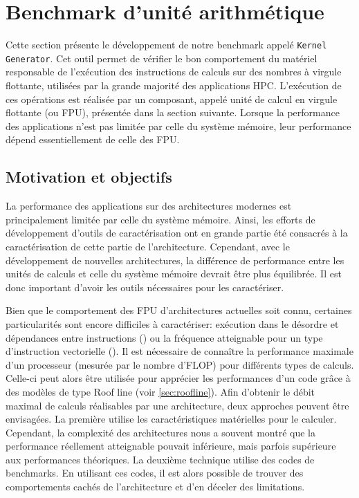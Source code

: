 \section{Benchmark d'unité arithmétique}\label{sec:kg}


    Cette section présente le développement de notre benchmark appelé \verb=Kernel Generator=. Cet outil permet de vérifier le bon comportement du matériel responsable de l'exécution des instructions de calculs sur des nombres à virgule flottante, utilisées par la grande majorité des applications HPC. L'exécution de ces opérations est réalisée par un composant, appelé unité de calcul en virgule flottante (ou \gls{FPU}), présentée dans la section suivante. Lorsque la performance des applications n'est pas limitée par celle du système mémoire, leur performance dépend essentiellement de celle des FPU. 



\subsection{Motivation et objectifs}
    
    La performance des applications sur des architectures modernes est principalement limitée par celle du système mémoire. Ainsi, les efforts de développement d'outils de caractérisation ont en grande partie été consacrés à la caractérisation de cette partie de l’architecture. Cependant, avec le développement de nouvelles architectures, la différence de performance entre les unités de calculs et celle du système mémoire devrait être plus équilibrée. Il est donc important d'avoir les outils nécessaires pour les caractériser.
    
    Bien que le comportement des FPU d'architectures actuelles soit connu, certaines particularités sont encore difficiles à caractériser: exécution dans le désordre et dépendances entre instructions () ou la fréquence atteignable pour un type d'instruction vectorielle ().
    Il est nécessaire de connaître la performance maximale d'un processeur (mesurée par le nombre d'\gls{FLOP}) pour différents types de calculs. Celle-ci peut alors être utilisée pour apprécier les performances d'un code grâce à des modèles de type Roof line (voir \autoref{sec:roofline}). Afin d'obtenir le débit maximal de calculs réalisables par une architecture, deux approches peuvent être envisagées. La première utilise les caractéristiques matérielles pour le calculer. Cependant, la complexité des architectures nous a souvent montré que la performance réellement atteignable pouvait inférieure, mais parfois supérieure aux performances théoriques. La deuxième technique utilise des codes de \glspl{benchmark}. En utilisant ces codes, il est alors possible de trouver des comportements cachés de l'architecture et d'en déceler des limitations.
    

